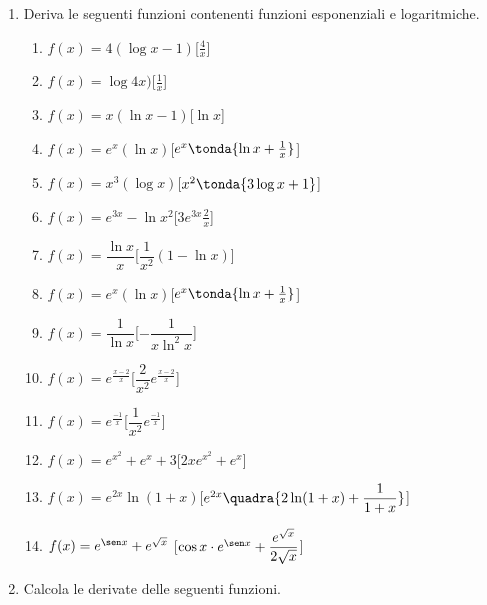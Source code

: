 \begin{enumerate}
\item Deriva le seguenti funzioni contenenti funzioni esponenziali e 
logaritmiche.

\begin{enumerate}
\item \(f(x)=4(\log x -1)\)\hfill [\(\frac{4}{x}\)]
\item \(f(x)=\log 4x)\)\hfill [\(\frac{1}{x}\)]
\item \(f(x)=x(\ln x -1)\)\hfill [\(\ln x\)]
\item \(f(x)=e^x(\ln x)\)\hfill [\(e^x\tonda{\ln x+\frac{1}{x}}\)]
\item \(f(x)=x^3(\log x)\)\hfill [\(x^2\tonda{3\log x+1}\)]
\item \(f(x)=e^{3x}-\ln x^2\)\hfill [\(3e^{3x}\frac{2}{x}\)]
\item \(f(x)=\dfrac{\ln x}{x}\)\hfill [\(\dfrac{1}{x^2}(1-\ln x)\)]
\item \(f(x)=e^x(\ln x)\)\hfill [\(e^x\tonda{\ln x+\frac{1}{x}}\)]
\item \(f(x)=\dfrac{1}{\ln x}\)\hfill [\(-\dfrac{1}{x\ln^2 x}\)]
\item \(f(x)=e^{\frac{x-2}{x}}\)\hfill [\(\dfrac{2}{x^2}e^{\frac{x-2}{x}}\)]
\item \(f(x)=e^{\frac{-1}{x}}\)\hfill [\(\dfrac{1}{x^2}e^{\frac{-1}{x}}\)]
\item \(f(x)=e^{x^2}+e^x+3\)\hfill [\(2xe^{x^2}+e^x\)]
\item \(f(x)=e^{2x}\ln(1+x)\)\hfill[\(e^{2x}\quadra{2\ln (1+x)+\dfrac{1}{1+x}}\)]
\item \(f(x)=e^{\sen x}+e^{\sqrt{x}}\)\hfill 
[\(\cos x \cdot e^{\sen x}+ \dfrac{e^{\sqrt{x}}}{2\sqrt{x}}\)]
\end{enumerate}

\item Calcola le derivate delle seguenti funzioni.


\end{enumerate}
